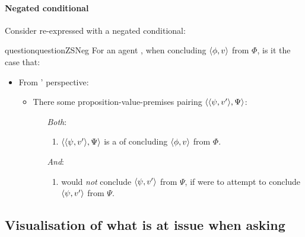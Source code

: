 \paragraph{Negated conditional}

\begin{note}
  Consider \qzS{} re-expressed with a negated conditional:
  \begin{restatable}[\nqzS{}]{question}{questionZSNeg}
    \label{question:zs:neg}
    For an agent \vAgent{}, when concluding \(\langle \phi, v \rangle\) from \(\Phi\), is it the case that:

    \begin{itemize}
    \item
      From \vAgent{}' perspective:
      \begin{itemize}
      \item
        There some proposition-value-premises pairing \(\langle \langle \psi, v' \rangle, \Psi \rangle\):
        \begin{itemize}
        \item[\emph{Both}:]
          \begin{enumerate}[label=\alph*., ref=(\alph*)]
          \item
            \(\langle \langle \psi, v' \rangle, \Psi \rangle\) is a \requ{} of concluding \(\langle \phi, v \rangle\) from \(\Phi\).
          \end{enumerate}
        \item[\emph{And}:]
          \begin{enumerate}[label=\alph*., ref=(\alph*), resume]
          \item
            \label{question:zs:may-fail}
            \vAgent{} would \emph{not} conclude \(\langle \psi, v' \rangle\) from \(\Psi\), if \vAgent{} were to attempt to conclude \(\langle \psi, v' \rangle\) from \(\Psi\).
          \end{enumerate}
        \end{itemize}
      \end{itemize}
    \end{itemize}
    \vspace{-\baselineskip}
  \end{restatable}
\end{note}

\subsection[Visualisation]{Visualisation of what is at issue when asking \qzS{}}

